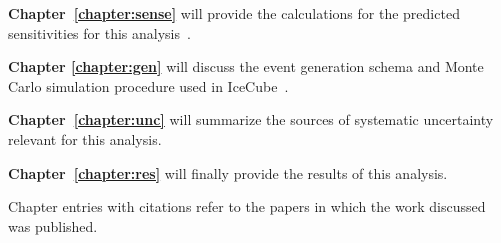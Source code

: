 \documentclass[main.tex]{subfiles}
\begin{document}
\textbf{Chapter~\ref{chapter:sense}} will provide the calculations for the predicted sensitivities for this analysis~\cite{PhysRevD.105.052001}. 

\textbf{Chapter \ref{chapter:gen}} will discuss the event generation schema and Monte Carlo simulation procedure used in IceCube~\cite{ABBASI2021108018}.

\textbf{Chapter~\ref{chapter:unc}} will summarize the sources of systematic uncertainty relevant for this analysis.

\textbf{ Chapter~\ref{chapter:res}} will finally provide the results of this analysis. 

Chapter entries with citations refer to the papers in which the work discussed was published.
\end{document}

